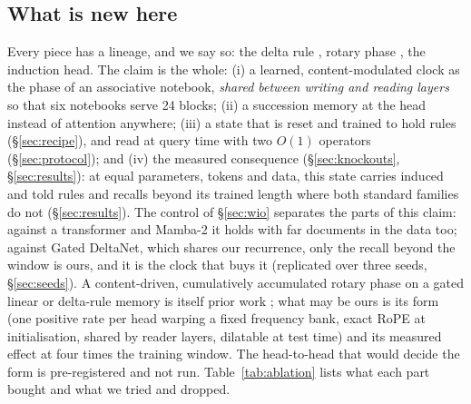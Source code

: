 \documentclass[11pt]{article}
\newcommand{\mamba}{Mamba-2}
\begin{document}
\subsection{What is new here}
Every piece has a lineage, and we say so: the delta rule \citep{schlag2021linear,yang2024gated}, rotary phase \citep{su2024roformer}, the induction head. The claim is the whole: (i) a learned, content-modulated clock as the phase of an associative notebook, \emph{shared between writing and reading layers} so that six notebooks serve 24 blocks; (ii) a succession memory at the head instead of attention anywhere; (iii) a state that is reset and trained to hold rules (\S\ref{sec:recipe}), and read at query time with two $O(1)$ operators (\S\ref{sec:protocol}); and (iv) the measured consequence (\S\ref{sec:knockouts}, \S\ref{sec:results}): at equal parameters, tokens and data, this state carries induced and told rules and recalls beyond its trained length where both standard families do not (\S\ref{sec:results}). The control of \S\ref{sec:wio} separates the parts of this claim: against a transformer and \mamba{} it holds with far documents in the data too; against Gated DeltaNet, which shares our recurrence, only the recall beyond the window is ours, and it is the clock that buys it (replicated over three seeds, \S\ref{sec:seeds}). A content-driven, cumulatively accumulated rotary phase on a gated linear or delta-rule memory is itself prior work \citep{movahedi2026selective}; what may be ours is its form (one positive rate per head warping a fixed frequency bank, exact RoPE at initialisation, shared by reader layers, dilatable at test time) and its measured effect at four times the training window. The head-to-head that would decide the form is pre-registered and not run. Table~\ref{tab:ablation} lists what each part bought and what we tried and dropped.
\end{document}
